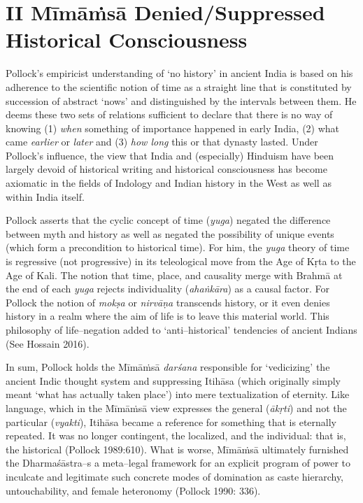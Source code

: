 \section*{II Mīmāṁsā Denied/Suppressed Historical Consciousness}

Pollock’s empiricist understanding of ‘no history’ in ancient India is based on his adherence to the scientific notion of time as a straight line that is constituted by succession of abstract ‘nows’ and distinguished by the intervals between them. He deems these two sets of relations sufficient to declare that there is no way of knowing (1) \textit{when} something of importance happened in early India, (2) what came \textit{earlier }or \textit{later} and (3) \textit{how long} this or that dynasty lasted. Under Pollock’s influence, the view that India and (especially) Hinduism have been largely devoid of historical writing and historical consciousness has become axiomatic in the fields of Indology and Indian history in the West as well as within India itself.

Pollock asserts that the cyclic concept of time (\textit{yuga}) negated the difference between myth and history as well as negated the possibility of unique events (which form a precondition to historical time). For him, the \textit{yuga} theory of time is regressive (not progressive) in its teleological move from the Age of Kṛta to the Age of Kali. The notion that time, place, and causality merge with Brahmā at the end of each \textit{yuga} rejects individuality (\textit{ahaṅkāra}) as a causal factor. For Pollock the notion of \textit{mokṣa} or \textit{nirvāṇa} transcends history, or it even denies history in a realm where the aim of life is to leave this material world. This philosophy of life–negation added to ‘anti–historical’ tendencies of ancient Indians (See Hossain 2016).

In sum, Pollock holds the Mīmāṁsā \textit{darśana} responsible for ‘vedicizing’ the ancient Indic thought system and suppressing Itihāsa (which originally simply meant ‘what has actually taken place’) into mere textualization of eternity. Like language, which in the Mīmāṁsā view expresses the general (\textit{ākṛti}) and not the particular (\textit{vyakti}), Itihāsa became a reference for something that is eternally repeated. It was no longer contingent, the localized, and the individual: that is, the historical (Pollock 1989:610). What is worse, Mīmāṁsā ultimately furnished the Dharmaśāstra–s a meta–legal framework for an explicit program of power to inculcate and legitimate such concrete modes of domination as caste hierarchy, untouchability, and female heteronomy (Pollock 1990: 336).


